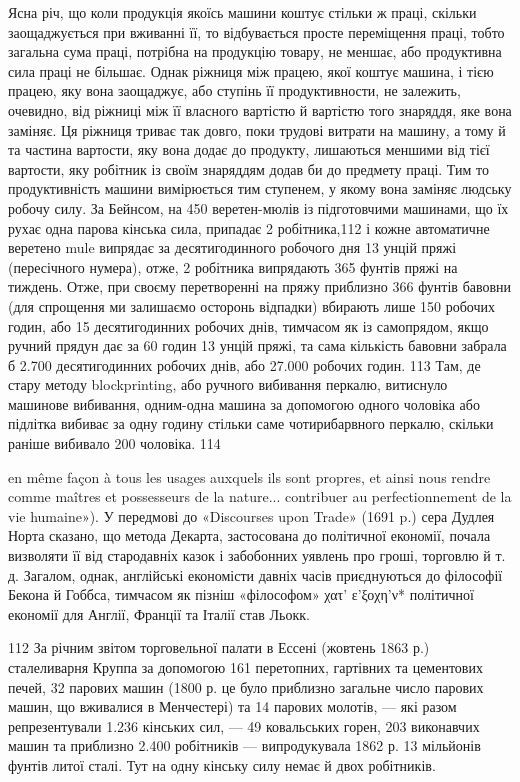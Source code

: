 Ясна річ, що коли продукція якоїсь машини коштує стільки ж
праці, скільки заощаджується при вживанні її, то відбувається
просте переміщення праці, тобто загальна сума праці, потрібна
на продукцію товару, не меншає, або продуктивна сила праці не
більшає. Однак ріжниця між працею, якої коштує машина, і
тією працею, яку вона заощаджує, або ступінь її продуктивности,
не залежить, очевидно, від ріжниці між її власного вартістю й
вартістю того знаряддя, яке вона заміняє. Ця ріжниця триває
так довго, поки трудові витрати на машину, а тому й та частина
вартости, яку вона додає до продукту, лишаються меншими від
тієї вартости, яку робітник із своїм знаряддям додав би до предмету
праці. Тим то продуктивність машини вимірюється тим
ступенем, у якому вона заміняє людську робочу силу. За Бейнсом,
на 450 веретен-мюлів із підготовчими машинами, що їх рухає
одна парова кінська сила, припадає 2 робітника,112 і кожне
автоматичне веретено mule випрядає за десятигодинного робочого
дня 13 унцій пряжі (пересічного нумера), отже, 2 робітника
випрядають 365 фунтів пряжі на тиждень. Отже, при своєму
перетворенні на пряжу приблизно 366 фунтів бавовни (для спрощення
ми залишаємо осторонь відпадки) вбирають лише 150 робочих
годин, або 15 десятигодинних робочих днів, тимчасом як із
самопрядом, якщо ручний прядун дає за 60 годин 13 унцій пряжі,
та сама кількість бавовни забрала б 2.700 десятигодинних робочих
днів, або 27.000 робочих годин. 113 Там, де стару методу
blockprinting, або ручного вибивання перкалю, витиснуло машинове
вибивання, одним-одна машина за допомогою одного чоловіка
або підлітка вибиває за одну годину стільки саме чотирибарвного
перкалю, скільки раніше вибивало 200 чоловіка. 114

en même façon à tous les usages auxquels ils sont propres, et ainsi nous
rendre comme maîtres et possesseurs de la nature... contribuer au perfectionnement
de la vie humaine»). У передмові до «Discourses upon Trade»
(1691 p.) сера Дудлея Норта сказано, що метода Декарта, застосована
до політичної економії, почала визволяти її від стародавніх казок і забобонних
уявлень про гроші, торговлю й т. д. Загалом, однак, англійські
економісти давніх часів приєднуються до філософії Бекона й Гоббса, тимчасом
як пізніш «філософом» χατ’ ε’ξοχη'ν* політичної економії для Англії,
Франції та Італії став Льокк.

112 За річним звітом торговельної палати в Ессені (жовтень 1863 р.)
сталеливарня Круппа за допомогою 161 перетопних, гартівних та цементових
печей, 32 парових машин (1800 р. це було приблизно загальне число
парових машин, що вживалися в Менчестері) та 14 парових молотів, —
які разом репрезентували 1.236 кінських сил, — 49 ковальських горен,
203 виконавчих машин та приблизно 2.400 робітників — випродукувала
1862 р. 13 мільйонів фунтів литої сталі. Тут на одну кінську силу немає
й двох робітників.

